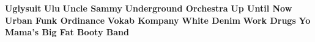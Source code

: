 \vspace{10pt} 
\noindent \textbf{Uglysuit}\newline
\vspace{10pt} 
\newline
\vspace{10pt} 
\noindent \textbf{Ulu}\newline
\vspace{10pt} 
\newline
\vspace{10pt} 
\noindent \textbf{Uncle Sammy}\newline
\vspace{10pt} 
\newline
\vspace{10pt} 
\noindent \textbf{Underground Orchestra}\newline
\vspace{10pt} 
\newline
\vspace{10pt} 
\noindent \textbf{Up Until Now}\newline
\vspace{10pt} 
\newline
\vspace{10pt} 
\noindent \textbf{Urban Funk Ordinance}\newline
\vspace{10pt} 
\newline
\vspace{10pt} 
\noindent \textbf{Vokab Kompany}\newline
\vspace{10pt} 
\newline
\vspace{10pt} 
\noindent \textbf{White Denim}\newline
\vspace{10pt} 
\newline
\vspace{10pt} 
\noindent \textbf{Work Drugs}\newline
\vspace{10pt} 
\newline
\vspace{10pt} 
\noindent \textbf{Yo Mama's Big Fat Booty Band}\newline
\vspace{10pt} 
